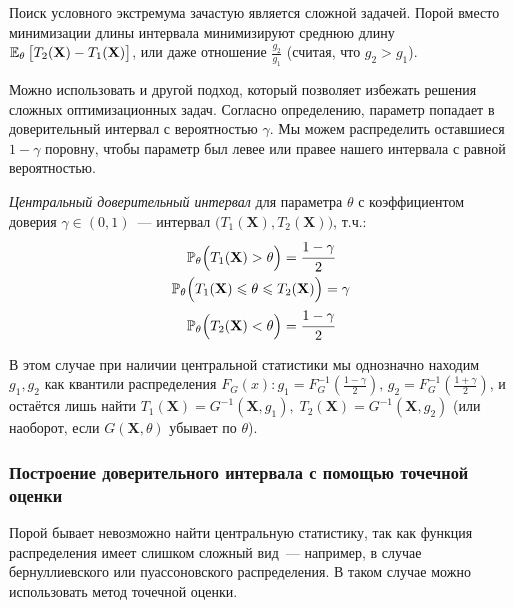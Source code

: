 Поиск условного экстремума зачастую является сложной задачей.
Порой вместо минимизации длины интервала минимизируют среднюю длину $\mathbb{E}_{\theta}\, \bigl[ T_2(\mathbf{X}) - T_1(\mathbf{X}) \bigr]$, 
или даже отношение $\frac{g_2}{g_1}$ (считая, что $g_2 > g_1$).

\vspace{5mm}
Можно использовать и другой подход, который позволяет избежать решения сложных оптимизационных задач.
Согласно определению, параметр попадает в доверительный интервал с вероятностью $\gamma$.
Мы можем распределить оставшиеся $1 - \gamma$ поровну, чтобы параметр был левее или правее нашего интервала с равной вероятностью.

\begin{defn}
    \textit{Центральный доверительный интервал} для параметра $\theta$ с коэффициентом доверия $\gamma \in (0, 1)$~--- 
    интервал $\bigl(T_1(\mathbf{X}), T_2(\mathbf{X})\bigr)$, т.ч.:
    \begin{gather*}
        \mathbb{P}_{\theta}\Bigl(T_{1}(\mathbf{X}) > \theta\Bigr)=\cfrac{1-\gamma}{2} \\
        \mathbb{P}_{\theta}\Bigl(T_{1}(\mathbf{X}) \leqslant \theta \leqslant T_{2}(\mathbf{X})\Bigr)=\gamma \\
        \mathbb{P}_{\theta}\Bigl(T_{2}(\mathbf{X}) < \theta\Bigr)=\cfrac{1-\gamma}{2}
    \end{gather*}
\end{defn}

В этом случае при наличии центральной статистики мы однозначно находим $g_1, g_2$ как квантили распределения $F_G(x)\colon g_1 = F_G^{-1}\left(\frac{1 - \gamma}{2}\right), \, g_2 = F_G^{-1}\left(\frac{1 + \gamma}{2}\right)$, 
и остаётся лишь найти $T_1(\mathbf{X}) = G^{-1}(\mathbf{X}, g_1), \; T_2(\mathbf{X}) = G^{-1}(\mathbf{X}, g_2)$ (или наоборот, если $G(\mathbf{X}, \theta)$ убывает по $\theta$).

\subsubsection{Построение доверительного интервала с помощью точечной оценки}
Порой бывает невозможно найти центральную статистику, так как функция распределения имеет слишком сложный вид~--- 
например, в случае бернуллиевского или пуассоновского распределения.
В таком случае можно использовать метод точечной оценки.

